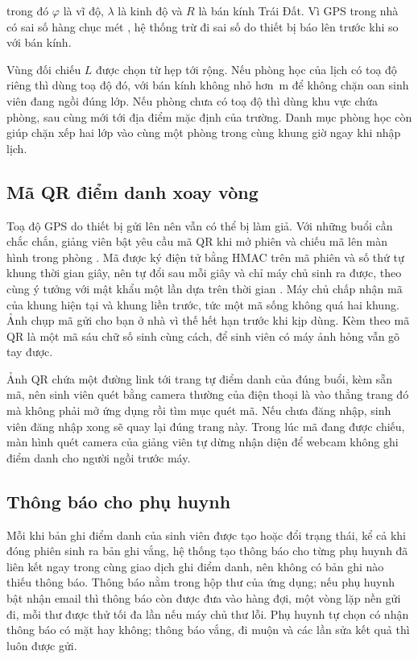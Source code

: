 trong đó $\varphi$ là vĩ độ, $\lambda$ là kinh độ và $R$ là bán kính Trái
Đất. Vì GPS trong nhà có sai số hàng chục mét \cite{Zandbergen2011Positional}, hệ thống trừ đi sai số do thiết
bị báo lên trước khi so với bán kính.

Vùng đối chiếu $L$ được chọn từ hẹp tới rộng. Nếu phòng học của lịch có toạ
độ riêng thì dùng toạ độ đó, với bán kính không nhỏ hơn \FbanKinhPhong\,m để
không chặn oan sinh viên đang ngồi đúng lớp. Nếu phòng chưa có toạ độ thì dùng
khu vực chứa phòng, sau cùng mới tới địa điểm mặc định của trường. Danh mục
phòng học còn giúp chặn xếp hai lớp vào cùng một phòng trong cùng khung giờ
ngay khi nhập lịch.

\subsection{Mã QR điểm danh xoay vòng}

Toạ độ GPS do thiết bị gửi lên nên vẫn có thể bị làm giả. Với những buổi cần
chắc chắn, giảng viên bật yêu cầu mã QR khi mở phiên và chiếu mã lên màn hình
trong phòng \cite{ISO18004}. Mã được ký điện tử bằng HMAC \cite{RFC2104} trên mã phiên và số thứ tự khung thời gian
\FgiayDoiQr{} giây, nên tự đổi sau mỗi \FgiayDoiQr{} giây và chỉ máy chủ sinh
ra được, theo cùng ý tưởng với mật khẩu một lần dựa trên thời gian
\cite{RFC6238}. Máy chủ chấp nhận mã của khung hiện tại và khung liền trước, tức một
mã sống không quá hai khung. Ảnh chụp mã gửi cho bạn ở nhà vì thế hết hạn trước
khi kịp dùng. Kèm theo mã QR là một mã sáu chữ số sinh cùng cách, để sinh viên
có máy ảnh hỏng vẫn gõ tay được.

Ảnh QR chứa một đường link tới trang tự điểm danh của đúng buổi, kèm sẵn mã,
nên sinh viên quét bằng camera thường của điện thoại là vào thẳng trang đó mà
không phải mở ứng dụng rồi tìm mục quét mã. Nếu chưa đăng nhập, sinh viên đăng
nhập xong sẽ quay lại đúng trang này. Trong lúc mã đang được chiếu, màn hình
quét camera của giảng viên tự dừng nhận diện để webcam không ghi điểm danh cho
người ngồi trước máy.

\subsection{Thông báo cho phụ huynh}

Mỗi khi bản ghi điểm danh của sinh viên được tạo hoặc đổi trạng thái, kể cả
khi đóng phiên sinh ra bản ghi vắng, hệ thống tạo thông báo cho từng phụ huynh
đã liên kết ngay trong cùng giao dịch ghi điểm danh, nên không có bản ghi nào
thiếu thông báo. Thông báo nằm trong hộp thư của ứng dụng; nếu phụ huynh bật
nhận email thì thông báo còn được đưa vào hàng đợi, một vòng lặp nền gửi đi, mỗi
thư được thử tối đa \FsoLanGuiEmail{} lần nếu máy chủ thư lỗi. Phụ huynh tự
chọn có nhận thông báo có mặt hay không; thông báo vắng, đi muộn và các lần
sửa kết quả thì luôn được gửi.

